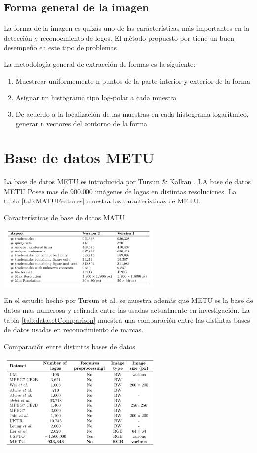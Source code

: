 \documentclass[conference]{IEEEtran}
\begin{document}
\subsection{Forma general de la imagen}

La forma de la imagen es quizás uno de las carácterísticas más importantes en la detección y reconocmiento de logos. El método propuesto por \cite{shape} tiene un buen desempeño en este tipo de problemas.

La metodología general de extracción de formas es la siguiente:

\begin{enumerate}
\item{Muestrear uniformemente n puntos de la parte interior y exterior de la forma}

\item{Asignar un histograma tipo log-polar a cada muestra}

\item{De acuerdo a la localización de las muestras en cada histograma logarítmico, generar n vectores del contorno de la forma}
\end{enumerate}


\section{Base de datos METU}
La base de datos METU es introducida por Tursun \& Kalkan \cite{metuV1}. LA base de datos METU Posee mas de 900.000 imágenes de logos en distintas resoluciones. La tabla \ref{tab:MATUFeatures} muestra las características de METU.
\begin{table}[h!]
	\caption{Características de base de datos MATU}
	\includegraphics[width=8cm]{images/caracteristicasMatu}
	\label{tab:MATUFeatures}
\end{table}

En el estudio hecho por Tursun et al. \cite{metuV2} se muestra además que METU es la base de datos mas numerosa y refinada entre las usadas actualmente en investigación. La tabla \ref{tab:datasetComparison} muestra una comparación entre las distintas bases de datos usadas en reconocimiento de marcas.
\begin{table}[h!]
	\caption{Comparación entre distintas bases de datos}
	\includegraphics[width=8cm]{images/comparasciondataset}
	\label{tab:datasetComparison}
\end{table}
\end{document}
